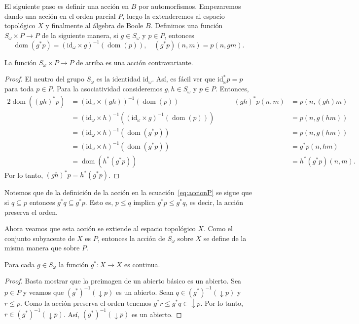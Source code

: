 \documentclass[letterpaper,DIV=15,12pt]{scrartcl}
\DeclareMathOperator{\dom}{dom}                            %
\newcommand{\id}{\mathrm{id}}                              %
\DeclareMathOperator{\abajo}{\downarrow}                   %
\begin{document}
El siguiente paso es definir una acción en \(B\) por automorfismos. Empezaremos
dando una acción en el orden parcial \(P\), luego la extenderemos al espacio
topológico \(X\) y finalmente al álgebra de Boole \(B\). Definimos una función
\(S_{\omega}\times P\to P\) de la siguiente manera, si \(g\in S_{\omega}\) y
\(p\in P\), entonces
\begin{equation}
    \label{eq:accionP}
    \dom(g^*p)=(\id_{\omega}\times g)^{-1}(\dom(p)), \quad 
    (g^*p)(n,m)=p(n,gm).
\end{equation}

\begin{lemma}
    La función \(S_{\omega}\times P\to P\) de arriba es una acción contravariante.
\end{lemma}
\begin{proof}
    El neutro del grupo \(S_{\omega}\) es la identidad \(\id_{\omega}\). Así, es
    fácil ver que \(\id_{\omega}^*p=p\) para toda \(p\in P\). Para la
    asociatividad consideremos \(g,h\in S_{\omega}\) y \(p\in P\). Entonces,
    \begin{alignat*}{2}
        \dom((gh)^*p)&=(\id_{\omega}\times(gh))^{-1}(\dom(p)) 
            &\qquad (gh)^*p(n,m)&=p(n,(gh)m)\\
        &=(\id_{\omega}\times h)^{-1}((\id_{\omega}\times g)^{-1}(\dom(p)))
        & &=p(n,g(hm))\\
        &=(\id_{\omega}\times h)^{-1}(\dom(g^*p))
        & &=p(n,g(hm))\\
        &=(\id_{\omega}\times h)^{-1}(\dom(g^*p))
        & &=g^*p(n,hm)\\
        &=\dom(h^*(g^*p)) & &=h^*(g^*p)(n,m).
    \end{alignat*}
    Por lo tanto, \((gh)^*p=h^*(g^*p)\).
\end{proof}

\begin{remark}
    Notemos que de la definición de la acción en la ecuación~\eqref{eq:accionP}
    se sigue que si \(q\subseteq p\) entonces \(g^*q\subseteq g^*p\). Esto es,
    \(p\leq q\) implica \(g^*p\leq g^*q\), es decir, la acción preserva el
    orden.
\end{remark}

Ahora veamos que esta acción se extiende al espacio topológico \(X\). Como el
conjunto subyacente de \(X\) es \(P\), entonces la acción de \(S_{\omega}\)
sobre \(X\) se define de la misma manera que sobre \(P\).

\begin{lemma}[label=lema:cont]
    Para cada \(g\in S_{\omega}\) la función \(g^*\colon X\to X\) es continua.
\end{lemma}
\begin{proof}
    Basta mostrar que la preimagen de un abierto básico es un abierto. Sea
    \(p\in P\) y veamos que \((g^*)^{-1}(\abajo p)\) es un abierto. Sean 
    \(q\in (g^*)^{-1}(\abajo p)\) y \(r\leq p\). Como la acción preserva el
    orden tenemos \(g^*r\leq g^*q\in\abajo p\). Por lo tanto, \(r\in
    (g^*)^{-1}(\abajo p)\). Así, \((g^*)^{-1}(\abajo p)\) es un abierto.
\end{proof}
\end{document}
